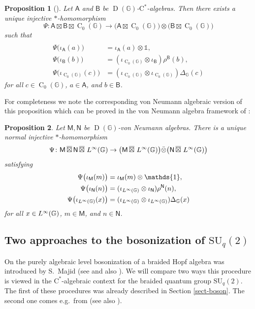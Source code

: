 \documentclass[12pt,reqno,a4paper]{amsart}
\newtheorem{proposition}{Proposition}[section]
\theoremstyle{definition}
\newcommand{\cst}{\ensuremath{\mathrm{C}^*}}
\newcommand{\I}{\mathds{1}}
\newcommand{\tens}{\otimes}
\newcommand{\GG}{\mathbb{G}}
\newcommand{\sA}{\mathsf{A}}
\newcommand{\sB}{\mathsf{B}}
\newcommand{\sM}{\mathsf{M}}
\newcommand{\sN}{\mathsf{N}}
\DeclareMathOperator{\C}{C}
\DeclareMathOperator{\D}{D}
\DeclareMathOperator{\Linf}{\mathnormal{L}^{\infty}}
\newcommand{\SU}{\mathrm{SU}}
\numberwithin{equation}{section}
\begin{document}
\begin{appendices}
\begin{proposition}[{\cite[Proposition 6.3]{MeyerRoyWoronowiczII}}]\label{prop-prop2Cstar}
Let $\sA$ and $\sB$ be $\D(\GG)$-\cst-algebras. Then there exists a unique injective $*$-homomorphism
\[
\Psi\colon\sA\boxtimes\sB\boxtimes\C_0(\GG)\longrightarrow
\bigl(\sA\boxtimes\C_0(\GG)\bigr)\tens
\bigl(\sB\boxtimes\C_0(\GG)\bigr)
\]
such that
\begin{align*}
\\
\Psi\bigl(\iota_{\sA}(a)\bigr)
&=\iota_{\sA}(a)\tens\I,\\
\Psi\bigl(\iota_{\sB}(b)\bigr)
&=(\iota_{\C_0(\GG)}\tens\iota_{\sB})\rho^{\sB}(b),\\
\Psi\bigl(\iota_{\C_0(\GG)}(c)\bigr)
&=(\iota_{\C_0(\GG)}\tens\iota_{\C_0(\GG)})\Delta_{\GG}(c)
\end{align*}
for all $c\in\C_0(\GG)$, $a\in\sA$, and $b\in\sB$.
\end{proposition}

For completeness we note the corresponding von Neumann algebraic version of this proposition which can be proved in the von Neumann algebra framework of \cite{DeCommerKrajczok}:

\begin{proposition}
Let $\sM,\sN$ be $\D(\GG)$-von Neumann algebras. There is a unique normal injective $*$-homomorphism
\[
\Psi\colon\sM\,\overline{\boxtimes}\,\sN\,\overline{\boxtimes}\,\Linf(\GG)\to
\bigl(\sM\,\overline{\boxtimes}\,\Linf(\GG)\bigr)\bar{\tens}
\bigl(\sN\,\overline{\boxtimes}\,\Linf(\GG)\bigr)
\]
satisfying
\begin{align*}
\Psi\bigl(\iota_{\sM}(m)\bigr)
&=\iota_{\sM}(m)\tens\I,\\
\Psi\bigl(\iota_{\sN}(n)\bigr)
&=(\iota_{\Linf(\GG)}\tens\iota_{\sN})\rho^{\sN}(n),\\
\Psi\bigl(\iota_{\Linf(\GG)}(x)\bigr)
&=(\iota_{\Linf(\GG)}\tens\iota_{\Linf(\GG)})\Delta_{\GG}(x)
\end{align*}
for all $x\in\Linf(\GG)$, $m\in\sM$, and $n\in\sN$.
\end{proposition}

\subsection{Two approaches to the bosonization of \texorpdfstring{$\SU_q(2)$}{SUq(2)}}\label{sect-BosonBoson}

On the purely algebraic level bosonization of a braided Hopf algebra was introduced by S.~Majid (see \cite[Chapter 16]{QGPrimer} and also \cite[Section 3.8]{HeckenbergerSchneider}). We will compare two ways this procedure is viewed in the \cst-algebraic context for the braided quantum group $\SU_q(2)$. The first of these procedures was already described in Section \ref{sect-boson}. The second one comes e.g.~from \cite[Theorem 6.4]{MeyerRoyWoronowiczII} (see also \cite{RoyBraided}).


\end{appendices}
\end{document}
